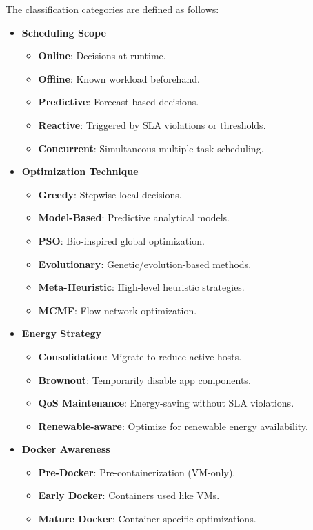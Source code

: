 \documentclass[runningheads]{llncs}
\begin{document}
The classification categories are defined as follows:
\begin{itemize}
  \small
  \item \textbf{Scheduling Scope}
    \begin{itemize}
      \item \textbf{Online}: Decisions at runtime.
      \item \textbf{Offline}: Known workload beforehand.
      \item \textbf{Predictive}: Forecast-based decisions.
      \item \textbf{Reactive}: Triggered by SLA violations or thresholds.
      \item \textbf{Concurrent}: Simultaneous multiple-task scheduling.
    \end{itemize}

  \item \textbf{Optimization Technique}
    \begin{itemize}
      \item \textbf{Greedy}: Stepwise local decisions.
      \item \textbf{Model-Based}: Predictive analytical models.
      \item \textbf{PSO}: Bio-inspired global optimization.
      \item \textbf{Evolutionary}: Genetic/evolution-based methods.
      \item \textbf{Meta-Heuristic}: High-level heuristic strategies.
      \item \textbf{MCMF}: Flow-network optimization.
    \end{itemize}

  \item \textbf{Energy Strategy}
    \begin{itemize}
      \item \textbf{Consolidation}: Migrate to reduce active hosts.
      \item \textbf{Brownout}: Temporarily disable app components.
      \item \textbf{QoS Maintenance}: Energy-saving without SLA violations.
      \item \textbf{Renewable-aware}: Optimize for renewable energy availability.
    \end{itemize}

  \item \textbf{Docker Awareness}
    \begin{itemize}
      \item \textbf{Pre-Docker}: Pre-containerization (VM-only).
      \item \textbf{Early Docker}: Containers used like VMs.
      \item \textbf{Mature Docker}: Container-specific optimizations.
    \end{itemize}
\end{itemize}
\end{document}
